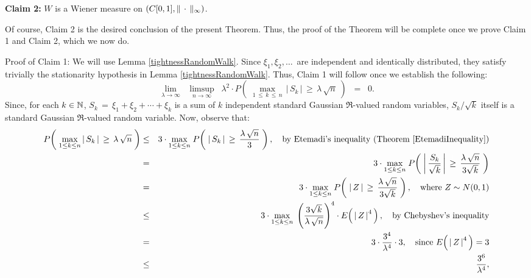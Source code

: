 \vskip 0.5cm
\begin{center}
\begin{minipage}{6.0in}
\noindent
\textbf{Claim 2:}\quad
$W$ is a Wiener measure on $\left(C[0,1],\Vert\,\cdot\,\Vert_{\infty}\right)$.
\end{minipage}
\end{center}

\vskip 0.5cm
\noindent
Of course, Claim 2 is the desired conclusion of the present Theorem.
Thus, the proof of the Theorem will be complete once we prove
Claim 1 and Claim 2, which we now do.

\vskip 0.5cm
\noindent
Proof of Claim 1:\quad
We will use Lemma \ref{tightnessRandomWalk}.
Since $\xi_{1}, \xi_{2}, \ldots\,$ are independent and identically distributed,
they satisfy trivially the stationarity hypothesis in Lemma \ref{tightnessRandomWalk}.
Thus, Claim 1 will follow once we establish the following:
\begin{equation*}
	\underset{\lambda\rightarrow\infty}{\lim}\;\;
	\underset{n\rightarrow\infty}{\limsup}\;\;
	\lambda^{2}\cdot
	P\!\left(\;\underset{1\,\leq\,k\,\leq\,n}{\max}\,\vert\,S_{k}\,\vert\,\geq\,\lambda\,\sqrt{n}\;\right)
	\;\;=\;\; 0.
\end{equation*}
Since, for each $k \in \mathbb{N}$, $S_{k} \,=\, \xi_{1} + \xi_{2} + \cdots + \xi_{k}$
is a sum of $k$ independent standard Gaussian $\Re$-valued random variables,
$S_{k}/\sqrt{k}$ itself is a standard Gaussian $\Re$-valued random variable.
Now, observe that:
\begin{eqnarray*}
P\!\left(\;
	\underset{1\leq k \leq n}{\max}\,\vert\,S_{k}\,\vert \,\overset{{\color{white}:}}{\geq}\,\lambda\,\sqrt{n}
\;\right)
&\leq&
	3 \cdot \underset{1\leq k \leq n}{\max}\;
	P\!\left(\;
		\vert\,S_{k}\,\vert \,\overset{{\color{white}1}}{\geq}\,\dfrac{\lambda\,\sqrt{n}}{3}
	\;\right),
	\quad
	\textnormal{by Etemadi's inequality (Theorem \ref{EtemadiInequality})}
\\
&=&
	3 \cdot \underset{1\leq k \leq n}{\max}\;
	P\!\left(\;
		\left\vert\,\dfrac{S_{k}}{\sqrt{k}}\,\right\vert \,\overset{{\color{white}1}}{\geq}\,\dfrac{\lambda\,\sqrt{n}}{3\sqrt{k}}
	\;\right)
\\
&=&
	3 \cdot \underset{1\leq k \leq n}{\max}\;
	P\!\left(\;
		\left\vert\,Z\,\right\vert \,\overset{{\color{white}1}}{\geq}\,\dfrac{\lambda\,\sqrt{n}}{3\sqrt{k}}
	\;\right),
	\quad
	\textnormal{where $Z \sim N(0,1)$}
\\
&\leq&
	3 \cdot \underset{1\leq k \leq n}{\max}\;
	\left(\dfrac{3\sqrt{k}}{\lambda\,\sqrt{n}}\right)^{4}
	\cdot
	E\!\left(\, \left\vert\,Z\,\right\vert^{4} \,\right),
	\quad
	\textnormal{by Chebyshev's inequality}
\\
&=&
	3 \cdot \dfrac{3^{4}}{\lambda^{4}} \cdot 3,
	\quad
	\textnormal{since $E\!\left(\, \left\vert\,Z\,\right\vert^{4} \,\right) = 3$}
\\
&\leq&
	\dfrac{3^{6}}{\lambda^{4}},
\end{eqnarray*}
